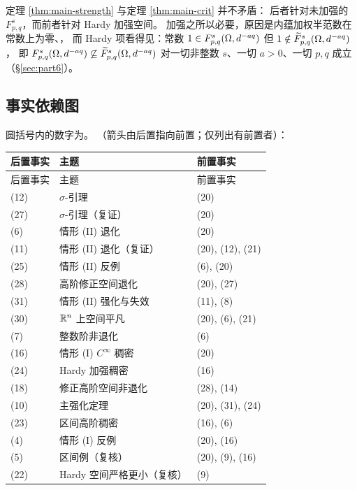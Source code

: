 \begin{remark}
定理 \ref{thm:main-strength} 与定理 \ref{thm:main-crit} 并不矛盾：
后者针对未加强的 $F^s_{p,q}$，而前者针对 Hardy 加强空间。
加强之所以必要，原因是内蕴加权半范数在常数上为零、，
而 Hardy 项看得见：常数 $1\in F^{s}_{p,q}(\Omega,d^{-aq})$ 但 $1\notin\widetilde F^{s}_{p,q}(\Omega,d^{-aq})$，
即 $F^{s}_{p,q}(\Omega,d^{-aq})\not\subseteq\widetilde F^{s}_{p,q}(\Omega,d^{-aq})$ 对一切非整数 $s$、一切 $a>0$、一切 $p,q$ 成立
（\S\ref{sec:part6}）。
\end{remark}

\subsection{事实依赖图}

圆括号内的数字为。
（箭头由后置指向前置；仅列出有前置者）：

\begin{center}
\footnotesize
\begin{longtable}{@{}lll@{}}
\toprule
后置事实 & 主题 & 前置事实 \\
\midrule
\endfirsthead
\toprule
后置事实 & 主题 & 前置事实 \\
\midrule
\endhead
(12) & $\sigma$-引理 & (20) \\
(27) & $\sigma$-引理（复证） & (20) \\
(6) & 情形 (II) 退化 & (20) \\
(11) & 情形 (II) 退化（复证） & (20), (12), (21) \\
(25) & 情形 (II) 反例 & (6), (20) \\
(28) & 高阶修正空间退化 & (20), (27) \\
(31) & 情形 (II) 强化与失效 & (11), (8) \\
(30) & $\mathbb{R}^n$ 上空间平凡 & (20), (6), (21) \\
(7) & 整数阶非退化 & (6) \\
(16) & 情形 (I) $C^\infty$ 稠密 & (20) \\
(24) & Hardy 加强稠密 & (16) \\
(18) & 修正高阶空间非退化 & (28), (14) \\
(10) & 主强化定理 & (20), (31), (24) \\
(23) & 区间高阶稠密 & (16), (6) \\
(4) & 情形 (I) 反例 & (20), (16) \\
(5) & 区间例（复核） & (20), (9), (16) \\
(22) & Hardy 空间严格更小（复核） & (9) \\
\bottomrule
\end{longtable}
\end{center}

